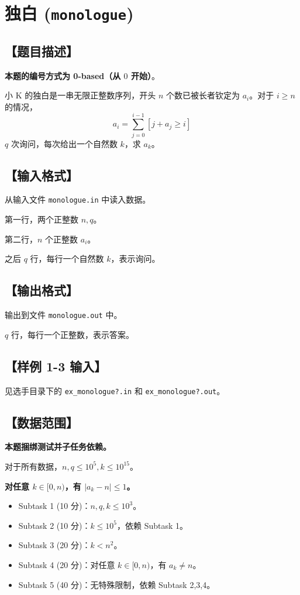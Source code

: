 \documentclass[UTF8]{ctexart}
\begin{document}
	\section*{独白 (\texttt{monologue})}
	\subsection*{【题目描述】}
	\textbf{本题的编号方式为 0-based（从 $0$ 开始）}。
	
	小 K 的独白是一串无限正整数序列，开头 $n$ 个数已被长者钦定为 $a_i$。对于 $i\ge n$ 的情况，
	$$
	a_i=\sum_{j=0}^{i-1}[j+a_j\ge i]
	$$
	\qquad $q$ 次询问，每次给出一个自然数 $k$，求 $a_k$。
	\subsection*{【输入格式】}
	从输入文件 \texttt{monologue.in} 中读入数据。
	
	第一行，两个正整数 $n,q$。
	
	第二行，$n$ 个正整数 $a_i$。
	
	之后 $q$ 行，每行一个自然数 $k$，表示询问。
	\subsection*{【输出格式】}
	输出到文件 \texttt{monologue.out} 中。
	
	$q$ 行，每行一个正整数，表示答案。
	\subsection*{【样例 1-3 输入】}
	见选手目录下的 \texttt{ex\_monologue?.in} 和 \texttt{ex\_monologue?.out}。
	\subsection*{【数据范围】}
	\textbf{本题捆绑测试并子任务依赖。}
	
	对于所有数据，$n,q\le 10^5,k\le 10^{15}$。
	
	\textbf{对任意 $k\in[0,n)$，有 $|a_k-n|\le 1$。}
	\begin{itemize}
		\item{Subtask 1 (10 分)：$n,q,k\le 10^3$。}
		\item{Subtask 2 (10 分)：$k\le 10^5$，依赖 Subtask 1。}
		\item{Subtask 3 (20 分)：$k<n^2$。}
		\item{Subtask 4 (20 分)：对任意 $k\in[0,n)$，有 $a_k\ne n$。}
		\item{Subtask 5 (40 分)：无特殊限制，依赖 Subtask 2,3,4。}
	\end{itemize}
	\newpage
\end{document}
